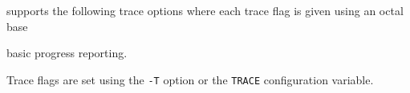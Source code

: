
 supports the following trace options where each
trace flag is given using an octal base
\begin{optlist}
    basic progress reporting.
\end{optlist}
Trace flags are set using the \texttt{-T} option or the  \texttt{TRACE} 
configuration variable.
